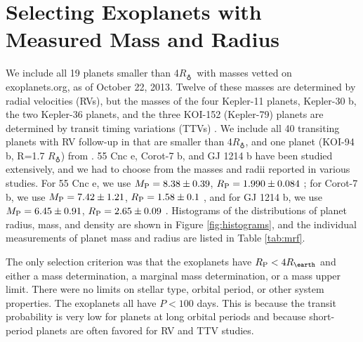 \documentclass[iop]{emulateapj}
\newcommand{\rpl}{\ensuremath{R_{\rm P}}}
\newcommand{\mpl}{\ensuremath{M_{\rm P}}}
\newcommand{\rearth}{\ensuremath{R_\earth}}
\begin{document}
\section{Selecting Exoplanets with Measured Mass and Radius}
We include all 19 planets smaller than 4\rearth\ with masses vetted on exoplanets.org, as of October 22, 2013.  Twelve of these masses are determined by radial velocities (RVs), but the masses of the four Kepler-11 planets, Kepler-30 b, the two Kepler-36 planets, and the three KOI-152 (Kepler-79) planets are determined by transit timing variations (TTVs) \citep{Lissauer2013, Sanchis-Ojeda2012, Carter2012,Jontof-Hutter2013}. We include all 40 transiting planets with RV follow-up in \citet{Marcy2013} that are smaller than 4\rearth, and one planet (KOI-94 b, R=1.7 \rearth) from \citet{Weiss2013}.  55 Cnc e, Corot-7 b, and GJ 1214 b have been studied extensively, and we had to choose from the masses and radii reported in various studies.  For 55 Cnc e, we use $\mpl = 8.38\pm0.39$, $\rpl = 1.990\pm0.084$ \citep{Endl2012,Dragomir2013}; for Corot-7 b, we use $\mpl =7.42\pm1.21$, $\rpl= 1.58\pm 0.1$ \citep{Hatzes2011}, and for GJ 1214 b, we use $\mpl =6.45\pm0.91 $, $\rpl= 2.65\pm0.09$ \citep{Carter2011}.  Histograms of the distributions of planet radius, mass, and density are shown in Figure \ref{fig:histograms}, and the individual measurements of planet mass and radius are listed in Table \ref{tab:mrf}.

The only selection criterion was that the exoplanets have $\rpl < 4 \rearth$ and either a mass determination, a marginal mass determination, or a mass upper limit.  There were no limits on stellar type, orbital period, or other system properties.  The exoplanets all have $P < 100$ days.  This is because the transit probability is very low for planets at long orbital periods and because short-period planets are often favored for RV and TTV studies.
\end{document}
